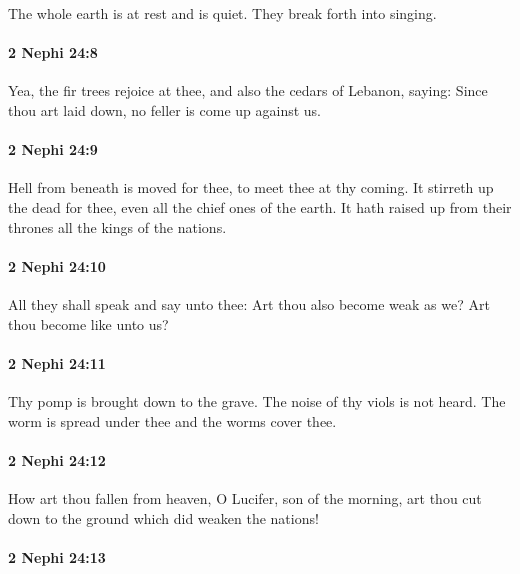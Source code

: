 			The whole earth is at rest and is quiet.
			They break forth into singing.

		\paragraph{2 Nephi 24:8} %
			\label{2NEPHI-24-8}

			Yea, the fir trees rejoice at thee,
			and also the cedars of Lebanon, saying:
			Since thou art laid down,
			no feller is come up against us.

		\paragraph{2 Nephi 24:9} %
			\label{2NEPHI-24-9}

			Hell from beneath is moved for thee,
			to meet thee at thy coming.
			It stirreth up the dead for thee,
			even all the chief ones of the earth.
			It hath raised up from their thrones all the kings of the nations.

		\paragraph{2 Nephi 24:10} %
			\label{2NEPHI-24-10}

			All they shall speak and say unto thee:
			Art thou also become weak as we?
			Art thou become like unto us?

		\paragraph{2 Nephi 24:11} %
			\label{2NEPHI-24-11}

			Thy pomp is brought down to the grave.
			The noise of thy viols is not heard.
			The worm is spread under thee and the worms cover thee.

		\paragraph{2 Nephi 24:12} %
			\label{2NEPHI-24-12}

			How art thou fallen from heaven, O Lucifer, son of the morning,
			art thou cut down to the ground which did weaken the nations!

		\paragraph{2 Nephi 24:13} %
			\label{2NEPHI-24-13}

